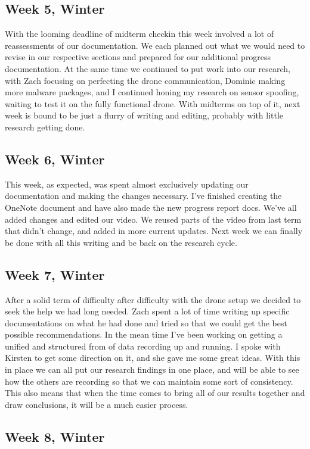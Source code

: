\documentclass[IEEEtran,letterpaper,10pt,notitlepage,draftclsnofoot,onecolumn]{article}
\begin{document}
\begin{sloppypar}
\subsection{Week 5, Winter}
With the looming deadline of midterm checkin this week involved a lot of reassessments of our documentation. We each planned out what we would need to revise in our respective sections and prepared for our additional progress documentation. At the same time we continued to put work into our research, with Zach focusing on perfecting the drone communication, Dominic making more malware packages, and I continued honing my research on sensor spoofing, waiting to test it on the fully functional drone. With midterms on top of it, next week is bound to be just a flurry of writing and editing, probably with little research getting done.
\subsection{Week 6, Winter}
This week, as expected, was spent almost exclusively updating our documentation and making the changes necessary. I've finished creating the OneNote document and have also made the new progress report docs. We've all added changes and edited our video. We reused parts of the video from last term that didn't change, and added in more current updates. Next week we can finally be done with all this writing and be back on the research cycle.
\subsection{Week 7, Winter}
After a solid term of difficulty after difficulty with the drone setup we decided to seek the help we had long needed. Zach spent a lot of time writing up specific documentations on what he had done and tried so that we could get the best possible recommendations. In the mean time I've been working on getting a unified and structured from of data recording up and running. I spoke with Kirsten to get some direction on it, and she gave me some great ideas. With this in place we can all put our research findings in one place, and will be able to see how the others are recording so that we can maintain some sort of consistency. This also means that when the time comes to bring all of our results together and draw conclusions, it will be a much easier process.
\subsection{Week 8, Winter}

\end{sloppypar}
\end{document}
